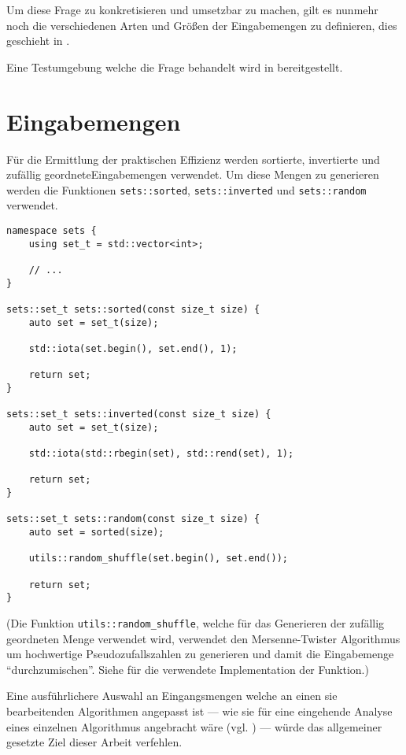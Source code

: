 Um diese Frage zu konkretisieren und umsetzbar zu machen, gilt es nunmehr noch die verschiedenen Arten und Größen der Eingabemengen zu definieren, dies geschieht in .

Eine Testumgebung welche die Frage behandelt wird in  bereitgestellt.

\section{Eingabemengen}
\label{sec:runtime-inputs}

Für die Ermittlung der praktischen Effizienz werden sortierte, invertierte und zufällig geordnete\nocit Eingabemengen verwendet. Um diese Mengen zu generieren werden die Funktionen \lstinline{sets::sorted}, \lstinline{sets::inverted} und \lstinline{sets::random} verwendet.

\begin{lstlisting}[caption=Funktionen welche Mengen der verwendeten Eingabemengearten generieren.]
namespace sets {
    using set_t = std::vector<int>;

    // ...
}

sets::set_t sets::sorted(const size_t size) {
	auto set = set_t(size);

	std::iota(set.begin(), set.end(), 1);

	return set;
}

sets::set_t sets::inverted(const size_t size) {
	auto set = set_t(size);

	std::iota(std::rbegin(set), std::rend(set), 1);

	return set;
}

sets::set_t sets::random(const size_t size) {
	auto set = sorted(size);

	utils::random_shuffle(set.begin(), set.end());

	return set;
}
\end{lstlisting}

(Die Funktion \lstinline{utils::random_shuffle}, welche für das Generieren der zufällig geordneten Menge verwendet wird, verwendet den Mersenne-Twister Algorithmus um hochwertige Pseudozufallszahlen zu generieren und damit die Eingabemenge \enquote{durchzumischen}. Siehe  für die verwendete Implementation der Funktion.)

Eine ausführlichere Auswahl an Eingangsmengen welche an einen sie bearbeitenden Algorithmen angepasst ist --- wie sie für eine eingehende Analyse eines einzelnen Algorithmus angebracht wäre (vgl. \cite[27ff]{mcg2012}) --- würde das allgemeiner gesetzte Ziel dieser Arbeit verfehlen.

